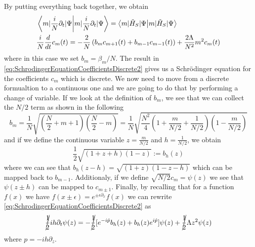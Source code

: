 \documentclass{article}
\begin{document}
By putting everything back together, we obtain
\begin{align}
	 & \braket{m|\frac{i}{N}\partial_t|\Psi} = \braket{m|\tilde{H}_{S}|\Psi}\label{eq:SchrodingerEquationCoefficientsDiscrete1}                                                               \\
	 & \frac{i}{N}\frac{d}{dt}c_{m}(t) =  -\frac{2}{N}\left( b_{m}c_{m+1}(t) + b_{m-1}c_{m-1}(t) \right) + \frac{2\Lambda}{N^2}m^2c_{m}(t)\label{eq:SchrodingerEquationCoefficientsDiscrete2}
\end{align}
where in this case we set $ b_{m} = \beta_m/N $.
The result in \cref{eq:SchrodingerEquationCoefficientsDiscrete2} gives us a Schr{\"o}dinger equation for the coefficients $ c_{m} $ which is discrete. We now need to move from a discrete formualtion to a continuous one and we are going to do that by performing a change of variable.
If we look at the definition of $ b_{m} $, we see that we can collect the $ N/2 $ term as shown in the following
\begin{equation}
	\label{eq:CoefficientCollectingN}
	b_m =\frac{1}{N}\sqrt{
		\left(\frac{N}{2} + m +1\right)  \left(\frac{N}{2} -m\right)
	}  =
	\frac{1}{N}\sqrt{
		\frac{N^2}{4}
		\left(1 + \frac{m}{N/2} +\frac{1}{N/2}\right)
		\left(1 -\frac{m}{N/2}\right)
	}
\end{equation}
and if we define the continuous variable $ z = \frac{m}{N/2} $  and $ h = \frac{1}{N/2} $, we obtain
\begin{equation}
	\label{eq:CoefficientContinuous}
	\frac{1}{2}
	\sqrt{
		\left(1 + z +h\right)
		\left(1 -z\right)
	}
	:=  b_{h}(z)
\end{equation}
where we can see that $ b_{h}(z-h) = \sqrt{ \left(1 + z \right)\left(1 -z -h\right) } $ which can be mapped back to $ b_{m-1} $.
Additionaly, if we define $ \sqrt{N/2}  c_{m}= \psi(z) $ we see that $ \psi(z \pm h) $ can be mapped to $ c_{m\pm 1} $.
Finally, by recalling that for a function $f(x)$ we have $ f(x \pm \epsilon) = e^{\pm \epsilon\partial_{x}}f(x) $ we can rewrite \cref{eq:SchrodingerEquationCoefficientsDiscrete2} as
\begin{equation} %
	\label{eq:SchrodingerEquationCoefficientsContinuous}
	\cancel{\frac{1}{2}}ih\partial_t\psi(z) =
	-\cancel{\frac{1}{2}}[ e^{-i\hat{p}} b_{h}(z) + b_{h}(z)e^{i\hat{p}} ]\psi(z) +
	\cancel{\frac{1}{2}}\Lambda z^2 \psi(z)
\end{equation}
where $ \hat{p} = -ih\partial_z $.
\end{document}
